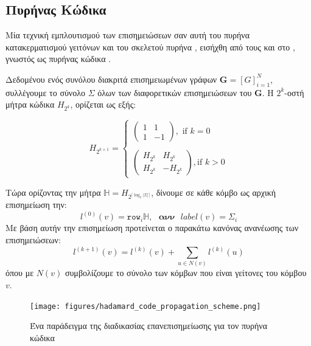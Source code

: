 \subsection{Πυρήνας Κώδικα }
\label{ssec:hc}
Μία τεχνική εμπλουτισμού των επισημειώσεων σαν αυτή του πυρήνα κατακερματισμού γειτόνων και του σκελετού πυρήνα , εισήχθη από τους  και  στο \cite{Kataoka}, γνωστός ως πυρήνας κώδικα .\par
Δεδομένου ενός συνόλου διακριτά επισημειωμένων γράφων $\mathbf{G}=[G]^{N}_{i=1}$, συλλέγουμε το σύνολο $\Sigma$ όλων των διαφορετικών επισημειώσεων του $\mathbf{G}$.
Η $2^{k}$-οστή μήτρα κώδικα  $H_{2^{k}}$, ορίζεται ως εξής:

\begin{equation}
H_{2^{k+1}}= \begin{cases}
\begin{pmatrix}
    1 & 1\\
    1 & -1
\end{pmatrix},\text{ if }k = 0
\\\\
\begin{pmatrix}
    H_{2^{k}} & H_{2^{k}}\\
    H_{2^{k}} & -H_{2^{k}}
\end{pmatrix},\text{if } k > 0
\end{cases}
\end{equation}

Τώρα ορίζοντας την μήτρα  $\mathbb{H} = H_{2^{\lceil \log_{2}|\Sigma|\rceil}}$, δίνουμε σε κάθε κόμβο ως αρχική επισημείωση την:
\begin{equation}
l^{(0)}(v) = \mathtt{row}_{i}\mathbb{H},\text{ }\textbf{ανν}\text{ }label(v) = \Sigma_{i}
\end{equation}
Με βάση αυτήν την επισημείωση προτείνεται ο παρακάτω κανόνας ανανέωσης των επισημειώσεων:
\begin{equation}
l^{(k+1)}(v) = l^{(k)}(v) + \sum_{u \in N(v)}l^{(k)}(u)
\end{equation}
όπου με $N(v)$ συμβολίζουμε το σύνολο των κόμβων που είναι γείτονες του κόμβου $v$.

\begin{figure}[]
\centering
\texttt{[image: figures/hadamard\_code\_propagation\_scheme.png]}
\caption{Ένα παράδειγμα της διαδικασίας επανεπισημείωσης για τον πυρήνα κώδικα }
\label{fig:hd_ps}
\end{figure}

